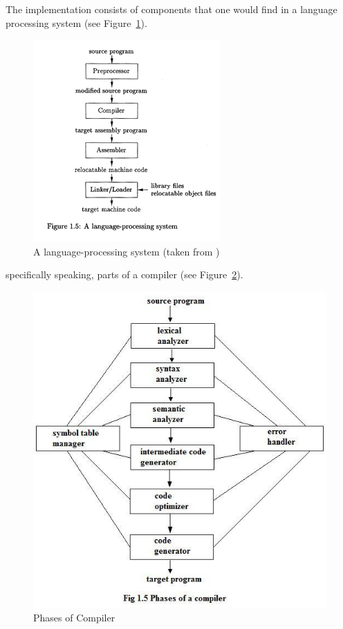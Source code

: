 \documentclass[thesis-solanki.tex]{subfiles}
\begin{document}
The implementation consists of components that one would find in a language processing system (see
Figure~\ref{fig:A language-processing system}).

\begin{figure}[th]
\centering
\includegraphics[scale = .95]{Language_Processing_System.png}
\caption{A language-processing system (taken from \cite{Aho:1986:CPT:6448})}
\label{fig:A language-processing system}
\end{figure}

specifically speaking, parts of a compiler (see Figure~\ref{fig:Phases of Compiler}).

\begin{figure}[th]
\centering
\includegraphics[scale = 0.7]{Phases_of_compiler.jpg}
\caption{Phases of Compiler \cite{Aho:1986:CPT:6448}}
\label{fig:Phases of Compiler}
\end{figure}
\end{document}
